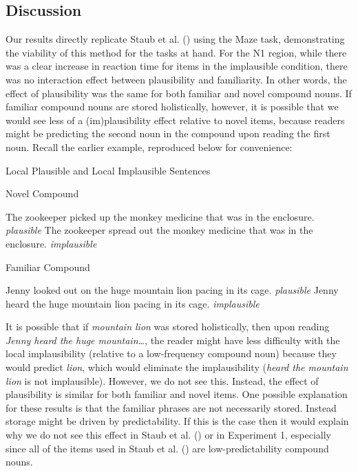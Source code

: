 \documentclass[
  12pt,
  letterpaper,
]{scrreport}
\begin{document}
\subsection{Discussion}\label{discussion}

Our results directly replicate Staub et al.
() using the Maze
task, demonstrating the viability of this method for the tasks at hand.
For the N1 region, while there was a clear increase in reaction time for
items in the implausible condition, there was no interaction effect
between plausibility and familiarity. In other words, the effect of
plausibility was the same for both familiar and novel compound nouns. If
familiar compound nouns are stored holistically, however, it is possible
that we would see less of a (im)plausibility effect relative to novel
items, because readers might be predicting the second noun in the
compound upon reading the first noun. Recall the earlier example,
reproduced below for convenience:

\begin{exe}
\ex Local Plausible and Local Implausible Sentences
\begin{xlist}
\ex Novel Compound
\begin{xlist}
\ex The zookeeper picked up the monkey medicine that was in the enclosure. \hfill \emph{plausible}
\ex The zookeeper spread out the monkey medicine that was in the enclosure. \hfill \emph{implausible}
\end{xlist}
\ex Familiar Compound
\begin{xlist}
\ex Jenny looked out on the huge mountain lion pacing in its cage. \hfill \emph{plausible}
\ex Jenny heard the huge mountain lion pacing in its cage. \hfill \emph{implausible} 
\end{xlist}
\end{xlist}
\end{exe}

\noindent It is possible that if \emph{mountain lion} was stored
holistically, then upon reading \emph{Jenny heard the huge
mountain\ldots{}}, the reader might have less difficulty with the local
implausibility (relative to a low-frequency compound noun) because they
would predict \emph{lion}, which would eliminate the implausibility
(\emph{heard the mountain lion} is not implausible). However, we do not
see this. Instead, the effect of plausibility is similar for both
familiar and novel items. One possible explanation for these results is
that the familiar phrases are not necessarily stored. Instead storage
might be driven by predictability. If this is the case then it would
explain why we do not see this effect in Staub et al.
() or in Experiment
1, especially since all of the items used in Staub et al.
() are
low-predictability compound nouns.
\end{document}
